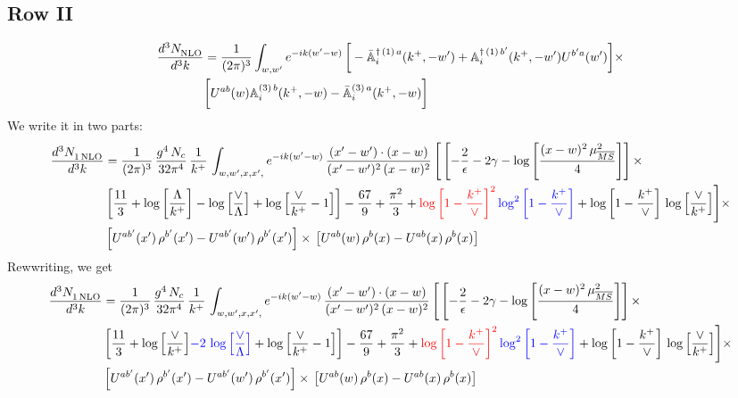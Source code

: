 \documentclass[9pt]{article}
\def\mf#1{\mathbb{#1}}
\numberwithin{equation}{section}
\begin{document}
\subsection{Row II}
\begin{align}
    \frac{d^{3}N_{\rm NLO}^{\rm}}{d^{3}k} &  = \frac{1}{(2\pi)^{3}}  \int_{w, w^\prime} e^{-ik(w^\prime-w)}\,\bigg[-\bar{\mf{A}}^{\dagger\,(1)\,a}_{i}(k^{+},-w^{\prime})+\mf{A}^{\dagger\, (1)\, b^{\prime}}_{i}(k^{+},-w^{\prime})U^{b^{\prime}a}(w^{\prime})\bigg]\times \notag \\ & \bigg[U^{ab}(w)\mf{A}^{(3)\, b}_{i}(k^{+},- w)-\Bar{\mf{A}}^{(3)\, a}_{i}(k^{+}, - w)\bigg]\nonumber
\end{align}
We write it in two parts: 
\begin{align}
     \frac{d^{3}N_{1\,\rm NLO}^{\rm}}{d^{3}k} &  = \frac{1}{(2\pi)^{3}}\, \frac{g^{4}\,N_{c}}{32\pi^{4}}\,\frac{1}{k^{+}}\, \int_{w, w',x,x',} e^{-ik(w^\prime-w)}\, \frac{(x'-w')\cdot (x-w)}{(x'-w')^{2}\, (x-w)^{2}}\, \Bigg[\left[-\frac{2}{\epsilon}-2\gamma-\log{\left[\frac{(x-w)^{2}\,\mu^{2}_{\overline{MS}}}{4}\right]}\right]\times \notag \\ & \left[\frac{11}{3}+\log{\left[\frac{\Lambda}{k^{+}}\right]}-\log{\left[\frac{\vee}{\Lambda}\right]}+\log{\left[\frac{\vee}{k^{+}}-1\right]}\right]-\frac{67}{9}+\frac{\pi^{2}}{3}+{\color{red}\log{\left[1-\frac{k^{+}}{\vee}\right]^{2}}}\,{\color{blue}\log^{2}{\left[1-\frac{k^{+}}{\vee}\right]}}+\log{\left[1-\frac{k^{+}}{\vee}\right]}\,\log{\left[\frac{\vee}{k^{+}}\right]}\Bigg]\times\notag \\ & \left[U^{ab'}(x')\,\rho^{b'}(x') - U^{ab'}(w')\,\rho^{b'}(x')\right]\times\,\left[U^{ab}(w)\,\rho^{b}(x) - U^{ab}(x)\,\rho^{b}(x)\right]
\end{align}
Rewwriting, we get
\begin{align}
     \frac{d^{3}N_{1\,\rm NLO}^{\rm}}{d^{3}k} &  = \frac{1}{(2\pi)^{3}}\, \frac{g^{4}\,N_{c}}{32\pi^{4}}\,\frac{1}{k^{+}}\, \int_{w, w',x,x',} e^{-ik(w^\prime-w)}\, \frac{(x'-w')\cdot (x-w)}{(x'-w')^{2}\, (x-w)^{2}}\, \Bigg[\left[-\frac{2}{\epsilon}-2\gamma-\log{\left[\frac{(x-w)^{2}\,\mu^{2}_{\overline{MS}}}{4}\right]}\right]\times \notag \\ & \left[\frac{11}{3}+\log{\left[\frac{\vee}{k^{+}}\right]}{\color{blue}-2\,\log{\left[\frac{\vee}{\Lambda}\right]}}+\log{\left[\frac{\vee}{k^{+}}-1\right]}\right]-\frac{67}{9}+\frac{\pi^{2}}{3}+{\color{red}\log{\left[1-\frac{k^{+}}{\vee}\right]^{2}}}\,{\color{blue}\log^{2}{\left[1-\frac{k^{+}}{\vee}\right]}}+\log{\left[1-\frac{k^{+}}{\vee}\right]}\,\log{\left[\frac{\vee}{k^{+}}\right]}\Bigg]\times\notag \\ & \left[U^{ab'}(x')\,\rho^{b'}(x') - U^{ab'}(w')\,\rho^{b'}(x')\right]\times\,\left[U^{ab}(w)\,\rho^{b}(x) - U^{ab}(x)\,\rho^{b}(x)\right]
\end{align}
\end{document}
